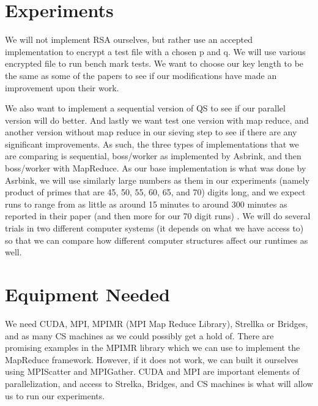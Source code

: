 \documentclass[11pt,twocolumn]{article}
\begin{document}
\section {Experiments}\label{exper}
We will not implement RSA ourselves, but rather use an accepted implementation to encrypt a test file with a chosen p and q. We will use various encrypted file to run bench mark tests. We want to choose our key length to be the same as some of the papers to see if our modifications have made an improvement upon their work.

We also want to implement a sequential version of QS to see if our parallel version will do better. And lastly we want test one version with map reduce, and another version without map reduce in our sieving step to see if there are any significant improvements. As such, the three types of implementations that we are comparing is sequential, boss/worker as implemented by Asbrink, and then boss/worker with MapReduce. As our base implementation is what was done by Asrbink, we will use similarly large numbers as them in our experiments (namely product of primes that are 45, 50, 55, 60, 65, and 70) digits long, and we expect runs to range from as little as around 15 minutes to around 300 minutes as reported in their paper (and then more for our 70 digit runs) \cite{asbrink:parallelqs}. We will do several trials in two different computer systems (it depends on what we have access to) so that we can compare how different computer structures affect our runtimes as well.

\section {Equipment Needed}\label{equip}
We need CUDA, MPI, MPIMR (MPI Map Reduce Library), Strellka or Bridges, and as many CS machines as we could possibly get a hold of. There are promising examples in the MPIMR library which we can use to implement the MapReduce framework. However, if it does not work, we can built it ourselves using MPIScatter and MPIGather. CUDA and MPI are important elements of parallelization, and access to Strelka, Bridges, and CS machines is what will allow us to run our experiments.
\end{document}
